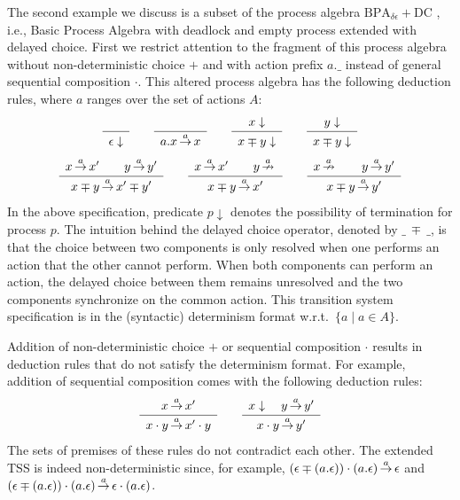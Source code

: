 \begin{example}\label{dc}
The second example we discuss is a subset of the process algebra $\mathrm{BPA}_{\delta\epsilon}+\mbox{DC}$ \cite{BaetenMauw94}, i.e., Basic Process Algebra with deadlock and empty process extended with delayed choice. First we restrict attention to the fragment of this process algebra without non-deterministic choice $+$ and with action prefix $a.\_$ instead of general sequential composition $\cdot$. This altered process algebra has the following deduction rules, where $a$ ranges over the set of actions $A$:
\[
\sosrule{}{\epsilon\downarrow}
\qquad
\sosrule{}{a.x \trans{a} x}
\qquad
\sosrule{x \downarrow}{x \mp y \downarrow}
\qquad
\sosrule{y \downarrow}{x \mp y \downarrow}
\]
\[
\sosrule{x \trans{a} x' \qquad y \trans{a} y'}{x \mp y \trans{a} x' \mp y'}
\qquad
\sosrule{x \trans{a} x' \qquad y \ntrans{a}}{x \mp y \trans{a} x'}
\qquad
\sosrule{x \ntrans{a} \qquad y \trans{a} y'}{x \mp y \trans{a} y'}
\]
In the above specification, predicate $p \downarrow$ denotes the possibility of termination for process $p$.
The intuition behind the delayed choice operator, denoted by $\_\ \mp\ \_$, is that the choice between
two components is only resolved when one performs an action that the other cannot perform.
When both components can perform an action, the delayed choice between them remains unresolved and
the two components synchronize on the common action.
This transition system specification is in the (syntactic) determinism format w.r.t.\ $\{ a \mid a \in A\}$.

Addition of non-deterministic choice $+$ or sequential composition $\cdot$ results in deduction rules that do not satisfy the determinism format. For example, addition of sequential composition comes with the following deduction rules:
\[ \sosrule{x \trans{a} x'}{x \cdot y \trans{a} x' \cdot y}
\qquad
\sosrule{x \downarrow \quad y \trans{a} y'}{x \cdot y \trans{a} y'}
\]
The sets of premises of these rules do not contradict each other.
The extended TSS is indeed non-deterministic since, for example, $(\epsilon \mp (a.\epsilon))\cdot (a.\epsilon) \,{\stackrel{{a}}{\rightarrow}}\, \epsilon$ and
$(\epsilon \mp (a.\epsilon))\cdot (a.\epsilon) \,{\stackrel{{a}}{\rightarrow}}\, \epsilon \cdot (a.\epsilon)$.
\end{example}

